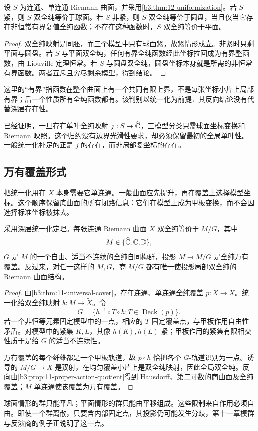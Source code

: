 \begin{proposition}[三模型的函数判别]\label{b3:prop:12-simply-connected-test}
设 \(S\) 为连通、单连通 Riemann 曲面，并采用\cref{b3:thm:12-uniformization}。若 \(S\) 紧，则 \(S\) 双全纯等价于球面。若 \(S\) 非紧，则 \(S\) 双全纯等价于圆盘，当且仅当它存在非恒常有界复值全纯函数；不存在这种函数时，\(S\) 双全纯等价于平面。
\end{proposition}
\begin{proof}
双全纯映射是同胚，而三个模型中只有球面紧，故紧情形成立。非紧时只剩平面与圆盘。若 \(S\) 与平面双全纯，任何有界全纯函数经此坐标拉回成为有界整函数，由 Liouville 定理恒常。若 \(S\) 与圆盘双全纯，圆盘坐标本身就是所需的非恒常有界函数。两者互斥且穷尽剩余模型，得到结论。
\end{proof}
这里的“有界”指函数在整个曲面上有一个共同有限上界，不是每张坐标小片上局部有界；后一个性质所有全纯函数都有。该判别以统一化为前提，其反向结论没有代替深层存在性。

\ProseParagraphBreak
{}已经证明，一旦存在单叶全纯映射 \(j:S\to\widehat{\mathbb C\kern0pt}\)，三模型分类只需球面坐标变换和 Riemann 映照。这个归约没有边界光滑性要求，却必须保留最初的全局单叶性。一般统一化补足的正是 \(j\) 的存在，而非局部复坐标的存在。

\subsection{万有覆盖形式}
\label{b3:subsec:120203}

把统一化用在 \(X\) 本身需要它单连通。一般曲面应先提升，再在覆盖上选择模型坐标。这个顺序保留底曲面的所有闭路信息：它们在模型上成为甲板变换，而不会因选择标准坐标被抹去。

\begin{corollary}[统一化的商形式]\label{b3:cor:12-quotient-uniformization}
采用深层统一化定理。每张连通 Riemann 曲面 \(X\) 双全纯等价于 \(M/G\)，其中
\[
 M\in\{\widehat{\mathbb C\kern0pt},\mathbb C,\mathbb D\},
\]
\(G\) 是 \(M\) 的一个自由、适当不连续的全纯自同构群，投影 \(M\to M/G\) 是全纯万有覆盖。反过来，对任一这样的 \(M,G\)，商 \(M/G\) 都有唯一使投影局部双全纯的 Riemann 曲面结构。
\end{corollary}
\begin{proof}
由\cref{b3:thm:11-universal-cover}，存在连通、单连通全纯覆盖 \(p:\widetilde X\to X\)。统一化给双全纯映射 \(h:M\to\widetilde X\)。令
\[
 G=\{h^{-1}\circ T\circ h:T\in\operatorname{Deck}(p)\}.
\]
若一个非恒等元素固定模型中的一点，相应的 \(T\) 固定覆盖点，与甲板作用自由性矛盾。对模型中的紧集 \(K,L\)，其像 \(h(K),h(L)\) 紧；甲板作用的紧集有限相交性质于是给 \(G\) 的适当不连续性。

万有覆盖的每个纤维都是一个甲板轨道，故 \(p\circ h\) 恰把各个 \(G\)-轨道识别为一点。诱导的 \(M/G\to X\) 是双射，在均匀覆盖小片上是双全纯映射，因此全局双全纯。反向由\cref{b3:prop:11-proper-action-quotient}得到 Hausdorff、第二可数的商曲面及全纯覆盖；\(M\) 单连通使该覆盖为万有覆盖。
\end{proof}
球面情形的群只能平凡；平面情形的群只能由平移组成。这些限制来自作用必须自由。即使一个群离散，只要含内部固定点，其投影仍可能发生分歧，第十一章模群与反演商的例子正说明了这一点。

